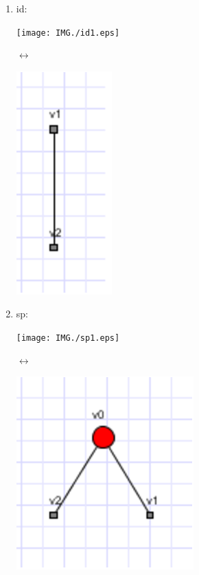 \documentclass[a4paper,oneside]{book}
\begin{document}
\begin{enumerate}
\item id:\
\begin{center}
\begin{minipage}[c]{0.25\textwidth}
\flushright\texttt{[image: IMG./id1.eps]}
\end{minipage}
\hspace{0.5cm}\Huge{$\longleftrightarrow$}
\begin{minipage}[c]{0.25\textwidth}
\includegraphics[scale=1]{IMG/id2.eps}
\end{minipage}
\label{id}
\end{center}

\item sp:\\
\begin{center}
\begin{minipage}[c]{0.25\textwidth}
\texttt{[image: IMG./sp1.eps]}
\end{minipage}
\hspace{0.5cm}\Huge{$\longleftrightarrow$}
\begin{minipage}[c]{0.25\textwidth}
\includegraphics[scale=1]{IMG/sp2.eps}
\end{minipage}
\label{sp}
\end{center}


\end{enumerate}
\end{document}
